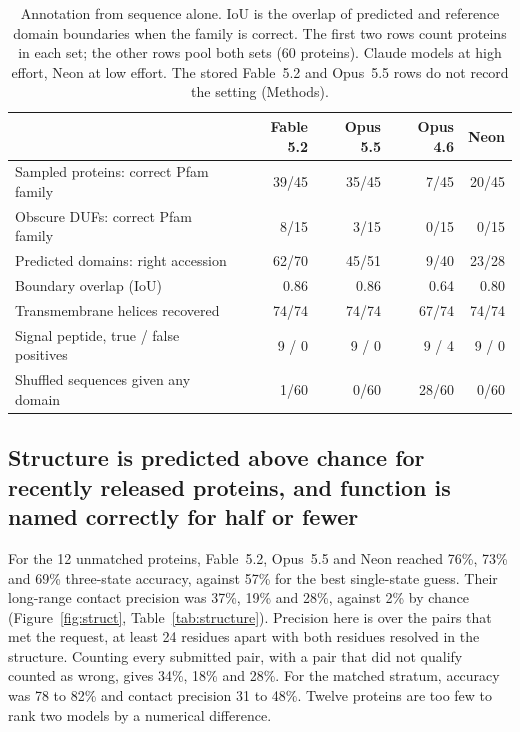 \documentclass[11pt]{article}
\begin{document}
\begin{table}[ht]
\centering\small
\caption{Annotation from sequence alone. IoU is the overlap of predicted and reference domain boundaries
when the family is correct. The first two rows count proteins in each set; the other rows pool both sets
(60 proteins). Claude models at high effort, Neon at low effort. The stored Fable~5.2 and Opus~5.5 rows do
not record the setting (Methods).}
\label{tab:feat}
\setlength{\tabcolsep}{4pt}
\begin{tabular}{lrrrr}
\toprule
 & Fable 5.2 & Opus 5.5 & Opus 4.6 & Neon \\
\midrule
Sampled proteins: correct Pfam family & 39/45 & 35/45 & 7/45 & 20/45 \\
Obscure DUFs: correct Pfam family & 8/15 & 3/15 & 0/15 & 0/15 \\
Predicted domains: right accession & 62/70 & 45/51 & 9/40 & 23/28 \\
Boundary overlap (IoU) & 0.86 & 0.86 & 0.64 & 0.80 \\
Transmembrane helices recovered & 74/74 & 74/74 & 67/74 & 74/74 \\
Signal peptide, true / false positives & 9 / 0 & 9 / 0 & 9 / 4 & 9 / 0 \\
Shuffled sequences given any domain & 1/60 & 0/60 & 28/60 & 0/60 \\
\bottomrule
\end{tabular}
\end{table}

\subsection{Structure is predicted above chance for recently released proteins, and function is named correctly for half or fewer}

For the 12 unmatched proteins, Fable~5.2, Opus~5.5 and Neon reached 76\%, 73\% and 69\% three-state accuracy,
against 57\% for the best single-state guess. Their long-range contact precision was 37\%, 19\% and 28\%,
against 2\% by chance (Figure~\ref{fig:struct}, Table~\ref{tab:structure}). Precision here is over the
pairs that met the request, at least 24 residues apart with both residues resolved in the structure.
Counting every submitted pair, with a pair that did not qualify counted as wrong, gives 34\%, 18\% and 28\%. For the matched stratum,
accuracy was 78 to 82\% and contact precision 31 to 48\%. Twelve proteins are too few to rank two models
by a numerical difference.
\end{document}
